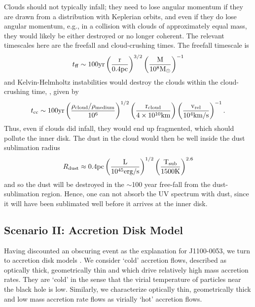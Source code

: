 \documentclass[a4paper,fleqn,usenatbib]{mnras}
\begin{document}
Clouds should not typically infall; they need to lose angular momentum
if they are drawn from a distribution with Keplerian orbits, and even
if they do lose angular momentum, e.g., in a collision with clouds of 
approximately equal mass, they would likely be either destroyed or no
longer coherent. The relevant timescales here are the freefall and
cloud-crushing times. The freefall timescale is 
\begin{equation}
    t_{{\rm ff}}   \sim 100   \rm{yr}  \left(\frac{r}{0.4\rm{pc}}\right)^{3/2} 
                                            \left(\frac{M}{10^{8}M_{\odot}}\right)^{-1}
\end{equation}
and Kelvin-Helmholtz instabilities would destroy the clouds within the
cloud-crushing time, \citep[e.g., ][]{Nagakura2008, Hopkins2013,
Shiokawa2015, Bae2016}, given by
\begin{equation}
    t_{\rm cc} \sim 100\rm{yr} \left(\frac{\rho_{cloud}/\rho_{medium}}{10^{6}}\right)^{1/2} 
                                            \left(\frac{r_{\rm cloud}}{4 \times 10^{10}\rm{km}}\right) 
                                            \left(\frac{v_{\rm rel}}{10^{4}\rm{km/s}}\right)^{-1}.
\label{eqn:T_cloudcrushing}
\end{equation}
Thus, even if clouds did infall, they would end up fragmented, which
should pollute the inner disk.  The dust in the cloud would then be
well inside the dust sublimation radius 
\begin{equation}
    R_{\rm dust} \approx 0.4\rm{pc}\left(\frac{L}{10^{45}\rm{erg/s}}\right)^{1/2}
                                                   \left(\frac{T_{\rm sub}}{1500\rm{K}}\right)^{2.6}
\end{equation}
and so the dust will be destroyed in the $\sim$100 year free-fall from
the dust-sublimation region. Hence, one can not absorb the UV spectrum
with dust, since it will have been sublimated well before it arrives
at the inner disk.


\subsection{Scenario II: Accretion Disk Model}
Having discounted an obscuring event as the explanation for
J1100-0053, we turn to accretion disk models \citep[see also the
recent review by ][]{YuanNarayan2014}. We consider `cold' accretion
flows, described as optically thick, geometrically thin and which drive
relatively high mass accretion rates. They are `cold' in the sense
that the virial temperature of particles near the black hole is
low. Similarly, we characterize optically thin, geometrically thick
and low mass accretion rate flows as virially `hot' accretion flows.
\end{document}
